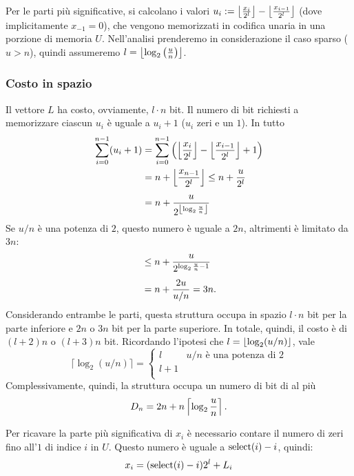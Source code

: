 Per le parti più significative, si calcolano i valori $u_i:=\left\lfloor \frac{x_i}{2^l} \right\rfloor-\left\lfloor \frac{x_{i-1}}{2^l} \right\rfloor$ (dove implicitamente $x_{-1}=0$), che vengono memorizzati in codifica unaria in una porzione di memoria $U$.
Nell'analisi prenderemo in considerazione il caso sparso ($u>n$), quindi assumeremo $l=\left\lfloor \log_2\left(\frac{u}{n}\right) \right\rfloor$.


\subsubsection{Costo in spazio}
Il vettore $L$ ha costo, ovviamente, $l\cdot n$ bit.
Il numero di bit richiesti a memorizzare ciascun $u_i$ è uguale a $u_i+1$ ($u_i$ zeri e un $1$). In tutto
\begin{align*}
	\sum_{i=0}^{n-1}(u_i+1) & = \sum_{i=0}^{n-1}\left(\left\lfloor \frac{x_i}{2^l} \right\rfloor-\left\lfloor \frac{x_{i-1}}{2^l} \right\rfloor+1\right) \\
	                        & = n + \left\lfloor \frac{x_{n-1}}{2^l} \right\rfloor \leq n + \frac{u}{2^l}                             \\[1ex]
	                        & = n + \frac{u}{2^{\left\lfloor \log_2\frac{u}{n} \right\rfloor}}
\end{align*}
Se $u/n$ è una potenza di $2$, questo numero è uguale a $2n$, altrimenti è limitato da $3n$:
\begin{align*}
	 & \leq n+\frac{u}{2^{\log_2\frac{u}{n}-1}} \\[1ex]
	 & = n+\frac{2u}{u/n} = 3n \text.
\end{align*}
Considerando entrambe le parti, questa struttura occupa in spazio $l\cdot n$ bit per la parte inferiore e $2n$ o $3n$ bit per la parte superiore.
In totale, quindi, il costo è di $(l+2)n$ o $(l+3)n$ bit.
Ricordando l'ipotesi che $l=\left\lfloor \log_2(u/n) \right\rfloor$, vale
\begin{equation*}
	\lceil \log_2(u/n) \rceil =
	\begin{cases}
		l & u/n \text{ è una potenza di } 2 \\
		l +1                                \\
	\end{cases}
\end{equation*}
Complessivamente, quindi, la struttura occupa un numero di bit di al più
\begin{equation*}
	D_n = 2n+n\left\lceil \log_2\frac un \right\rceil \text.
\end{equation*}


Per ricavare la parte più significativa di $x_i$ è necessario contare il numero di zeri fino all'$1$ di indice $i$ in $U$. Questo numero è uguale a $\mathrm{select}(i)-i$, quindi:
\begin{equation*}
	x_i=(\mathrm{select}(i)-i)2^l+L_i
\end{equation*}

